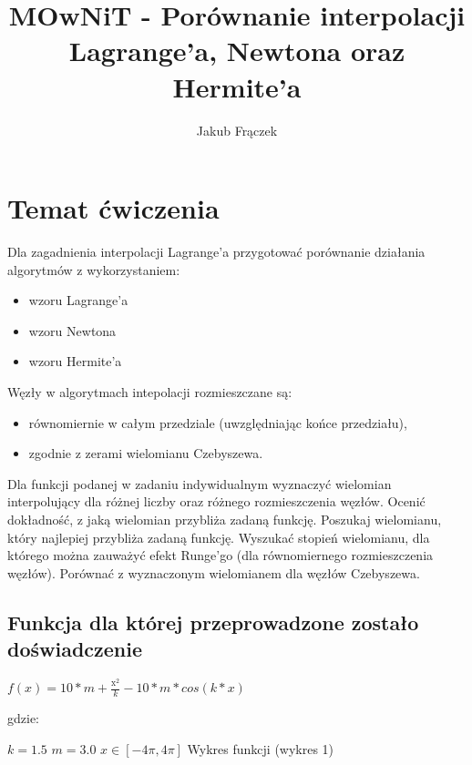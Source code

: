 \documentclass{article}
\title{MOwNiT - Porównanie interpolacji Lagrange'a, Newtona oraz Hermite'a}
\author{Jakub Frączek}
\begin{document}
\maketitle

\section{Temat ćwiczenia}

Dla zagadnienia interpolacji Lagrange'a przygotować porównanie działania algorytmów z wykorzystaniem:

\begin{itemize}
\item wzoru Lagrange'a
\item wzoru Newtona
\item wzoru Hermite'a
\end{itemize}

Węzły w algorytmach intepolacji rozmieszczane są:
\begin{itemize}
\item równomiernie w całym przedziale (uwzględniając końce przedziału),
\item zgodnie z zerami wielomianu Czebyszewa.
\end{itemize}

Dla funkcji podanej w zadaniu indywidualnym wyznaczyć wielomian interpolujący dla różnej liczby oraz różnego
rozmieszczenia węzłów. Ocenić dokładność, z jaką wielomian przybliża zadaną funkcję.  
Poszukaj wielomianu, który najlepiej przybliża zadaną funkcję. Wyszukać stopień wielomianu, dla którego można zauważyć efekt Runge’go (dla równomiernego rozmieszczenia węzłów). Porównać z wyznaczonym wielomianem dla węzłów Czebyszewa.

\subsection{Funkcja dla której przeprowadzone zostało doświadczenie}

\begin{center}
\(f(x) = 10 * m + \frac{\mathrm{x}_{}^{2}}{k} - 10 * m * cos(k*x)\)
\end{center}

\noindent
gdzie:

\bigbreak

\(k = 1.5\)
\newline \indent
\(m = 3.0\)
\newline \indent
\(x \in [-4\pi, 4\pi]\)
\bigbreak
Wykres funkcji (wykres 1)
\end{document}
